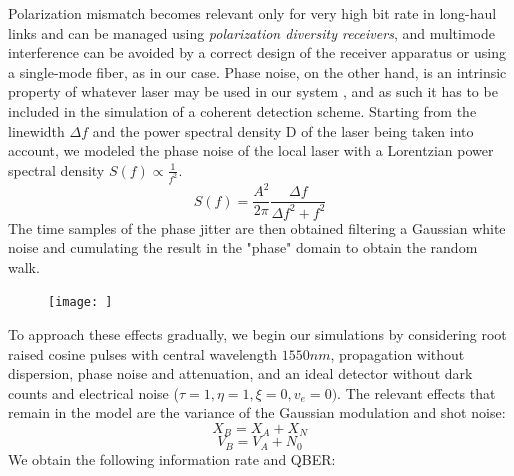 \documentclass[journal, letterpaper]{IEEEtran}
\begin{document}
Polarization mismatch becomes relevant only for very high bit rate in long-haul links and can be managed using \textit{polarization diversity receivers}, and multimode interference can be avoided by a correct design of the receiver apparatus\cite{agrawal} or using a single-mode fiber, as in our case. Phase noise\cite{phasenoise}, on the other hand, is an intrinsic property of whatever laser may be used in our system \cite{orazio}, and as such it has to be included in the simulation of a coherent detection scheme. Starting from the linewidth $\Delta f$ and the power spectral density D of the laser being taken into account, we modeled the phase noise of the local laser with a Lorentzian power spectral density $S{(f)} \propto \frac{1}{f^2}$. 
\[
S{(f)} = \frac{A^2}{2\pi} \frac{\Delta f}{\Delta f^2 + f^2}
\]
The time samples of the phase jitter are then obtained filtering a Gaussian white noise and cumulating the result in the "phase" domain to obtain the random walk.

\begin{figure}[!h]
    \centering
    \texttt{[image: ]}
        \caption{}
     \label{fig:quadtree}
\end{figure}

To approach these effects gradually, we begin our simulations by considering root raised cosine pulses with central wavelength $1550nm$, propagation without dispersion, phase noise and attenuation, and an ideal detector without dark counts and electrical noise ($\tau = 1,\eta = 1, \xi = 0, v_e = 0)$. The relevant effects that remain in the model are the variance of the Gaussian modulation and shot noise:
\[ X_B = X_A  +X_N \]
\[V_B = V_A + N_0 \]
We obtain the following information rate and QBER: 
\end{document}
